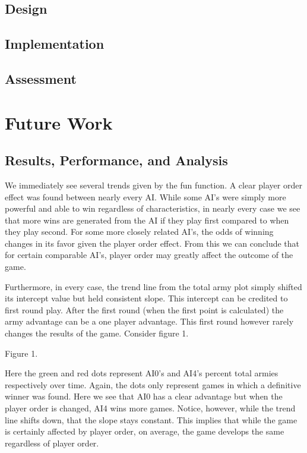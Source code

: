 \documentclass[12pt]{article}  %
\begin{document}
\subsection{Design}
\subsection{Implementation}
\subsection{Assessment}


\section{Future Work}






\subsection{Results, Performance, and Analysis }
We immediately see several trends given by the fun function. A clear player order effect was found between nearly every AI. While some AI’s were simply more powerful and able to win regardless of characteristics, in nearly every case we see that more wins are generated from the AI if they play first compared to when they play second. For some more closely related AI’s, the odds of winning changes in its favor given the player order effect. From this we can conclude that for certain comparable AI’s, player order may greatly affect the outcome of the game. 

Furthermore, in every case, the trend line from the total army plot simply shifted its intercept value but held consistent slope. This intercept can be credited to first round play. After the first round (when the first point is calculated) the army advantage can be a one player advantage. This first round however rarely changes the results of the game. Consider figure 1. 

\begin{center}
{\footnotesize Figure 1.}
\end{center}

Here the green and red dots represent AI0’s and AI4’s percent total armies respectively over time. Again, the dots only represent games in which a definitive winner was found. Here we see that AI0 has a clear advantage but when the player order is changed, AI4 wins more games. Notice, however, while the trend line shifts down, that the slope stays constant. This implies that while the game is certainly affected by player order, on average, the game develops the same regardless of player order. 
\end{document}
